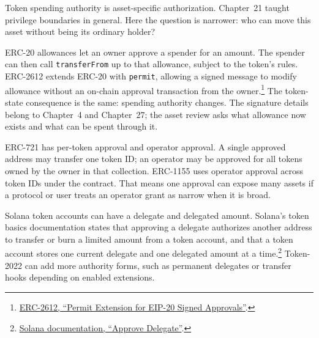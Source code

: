 Token spending authority is asset-specific authorization. Chapter~21 taught privilege boundaries in general. Here the question is narrower: who can move this asset without being its ordinary holder?

ERC-20 allowances let an owner approve a spender for an amount. The spender can then call \texttt{transferFrom} up to that allowance, subject to the token's rules. ERC-2612 extends ERC-20 with \texttt{permit}, allowing a signed message to modify allowance without an on-chain approval transaction from the owner.\footnote{\href{https://eips.ethereum.org/EIPS/eip-2612}{ERC-2612, ``Permit Extension for EIP-20 Signed Approvals''}.} The token-state consequence is the same: spending authority changes. The signature details belong to Chapter~4 and Chapter~27; the asset review asks what allowance now exists and what can be spent through it.

ERC-721 has per-token approval and operator approval. A single approved address may transfer one token ID; an operator may be approved for all tokens owned by the owner in that collection. ERC-1155 uses operator approval across token IDs under the contract. That means one approval can expose many assets if a protocol or user treats an operator grant as narrow when it is broad.

Solana token accounts can have a delegate and delegated amount. Solana's token basics documentation states that approving a delegate authorizes another address to transfer or burn a limited amount from a token account, and that a token account stores one current delegate and one delegated amount at a time.\footnote{\href{https://solana.com/docs/tokens/basics/approve-delegate}{Solana documentation, ``Approve Delegate''}.} Token-2022 can add more authority forms, such as permanent delegates or transfer hooks depending on enabled extensions.

